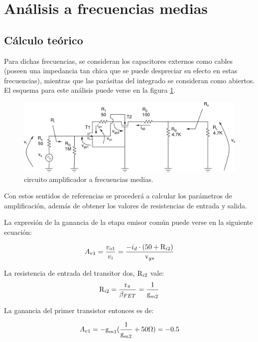 \section{Análisis a frecuencias medias}
\subsection{Cálculo teórico}

Para dichas frecuencias, se consideran los capacitores externos como cables (poseen una impedancia tan chica que se puede despreciar su efecto en estas frecuencias), mientras que las parásitas del integrado se consideran como abiertos. El esquema para este análisis puede verse en la figura \ref{im:frecuenciasMedias}.

\begin{figure}[ht]
	\centering
	\includegraphics[scale=0.5]{../img/frecuenciasMedias.pdf}
	\caption{circuito amplificador a frecuencias medias.}
	\label{im:frecuenciasMedias}
\end{figure}

Con estos sentidos de referencias se procederá a calcular los parámetros de amplificación, además de obtener los valores de resistencias de entrada y salida.

La expresión de la ganancia de la etapa emisor común puede verse en la siguiente ecuación:

\begin{equation}
	A_{v1} = \frac{v_{o1}}{v_i} = \frac{-i_{d} \cdot (50 +\mbox{R}_{i2})}{\mbox{v}_{gs}}
\end{equation}

La resistencia de entrada del transitor dos, $\mbox{R}_{i2}$ vale:
\begin{equation}
	\mbox{R}_{i2} = \frac{\mbox{r}_\pi}{\beta_{FET}} = \frac{1}{\mbox{g}_{m2}}
	\label{eq:Ri2}
\end{equation}

La ganancia del primer transistor entonces es de:

\begin{equation}
	A_{v1} =-\mbox{g}_{m1}(\frac{1}{\mbox{g}_{m2}}+50\Omega) = -0.5
	\label{eq:Av1}
\end{equation}

